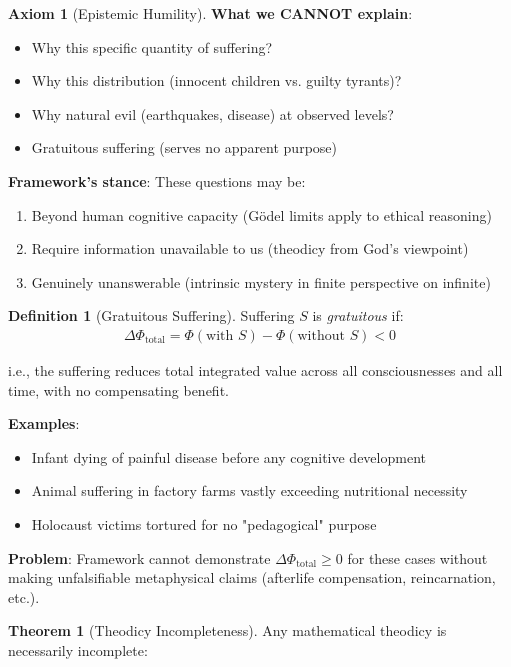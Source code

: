 \documentclass[11pt,a4paper]{article}
\theoremstyle{definition}
\newtheorem{definition}{Definition}[section]
\newtheorem{theorem}{Theorem}[section]
\newtheorem{axiom}{Axiom}[section]
\theoremstyle{remark}
\begin{document}
\begin{small}
\begin{enumerate}
\begin{axiom}[Epistemic Humility]
\textbf{What we CANNOT explain}:
\begin{itemize}
    \item Why this specific quantity of suffering?
    \item Why this distribution (innocent children vs. guilty tyrants)?
    \item Why natural evil (earthquakes, disease) at observed levels?
    \item Gratuitous suffering (serves no apparent purpose)
\end{itemize}

\textbf{Framework's stance}: These questions may be:
\begin{enumerate}
    \item Beyond human cognitive capacity (Gödel limits apply to ethical reasoning)
    \item Require information unavailable to us (theodicy from God's viewpoint)
    \item Genuinely unanswerable (intrinsic mystery in finite perspective on infinite)
\end{enumerate}
\end{axiom}

\begin{definition}[Gratuitous Suffering]
Suffering \(S\) is \textit{gratuitous} if:
\begin{align}
\Delta \Phi_{\text{total}} = \Phi(\text{with } S) - \Phi(\text{without } S) < 0
\end{align}

i.e., the suffering reduces total integrated value across all consciousnesses and all time, with no compensating benefit.

\textbf{Examples}:
\begin{itemize}
    \item Infant dying of painful disease before any cognitive development
    \item Animal suffering in factory farms vastly exceeding nutritional necessity
    \item Holocaust victims tortured for no "pedagogical" purpose
\end{itemize}

\textbf{Problem}: Framework cannot demonstrate \(\Delta \Phi_{\text{total}} \geq 0\) for these cases without making unfalsifiable metaphysical claims (afterlife compensation, reincarnation, etc.).
\end{definition}

\begin{theorem}[Theodicy Incompleteness]
Any mathematical theodicy is necessarily incomplete:


\end{theorem}
\end{enumerate}
\end{small}
\end{document}
